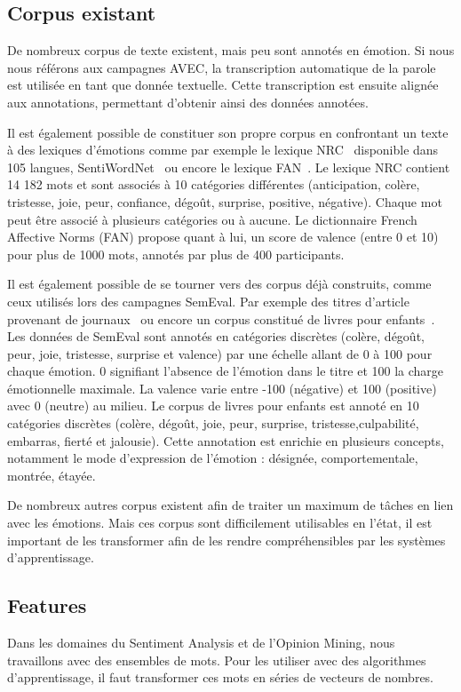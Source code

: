 \subsection{Corpus existant}
De nombreux corpus de texte existent, mais peu sont annotés en émotion. Si nous nous référons aux campagnes AVEC, la transcription automatique de la parole est utilisée en tant que donnée textuelle. Cette transcription est ensuite alignée aux annotations, permettant d'obtenir ainsi des données annotées.

Il est également possible de constituer son propre corpus en confrontant un texte à des lexiques d'émotions comme par exemple le lexique NRC~\cite{Mohammad2013} disponible dans 105 langues, SentiWordNet~\cite{Sebastiani2006} ou encore le lexique FAN~\cite{Monnier2014}.
Le lexique NRC contient 14 182 mots et sont associés à 10 catégories différentes (anticipation, colère, tristesse, joie, peur, confiance, dégoût, surprise, positive, négative). Chaque mot peut être associé à plusieurs catégories ou à aucune.
Le dictionnaire French Affective Norms (FAN) propose quant à lui, un score de valence (entre 0 et 10) pour plus de 1000 mots, annotés par plus de 400 participants.

Il est également possible de se tourner vers des corpus déjà construits, comme ceux utilisés lors des campagnes SemEval. Par exemple des titres d'article provenant de journaux~\cite{Strapparava2010} ou encore un corpus constitué de livres pour enfants~\cite{Etienne2020}. Les données de SemEval sont annotés en catégories discrètes (colère, dégoût, peur, joie, tristesse, surprise et valence) par une échelle allant de 0 à 100 pour chaque émotion. 0 signifiant l'absence de l'émotion dans le titre et 100 la charge émotionnelle maximale. La valence varie entre -100 (négative) et 100 (positive) avec 0 (neutre) au milieu. Le corpus de livres pour enfants est annoté en 10 catégories discrètes (colère, dégoût, joie, peur, surprise, tristesse,culpabilité, embarras, fierté et jalousie). Cette annotation est enrichie en plusieurs concepts, notamment le mode d'expression de l'émotion : désignée, comportementale, montrée, étayée.

De nombreux autres corpus existent afin de traiter un maximum de tâches en lien avec les émotions. Mais ces corpus sont difficilement utilisables en l'état, il est important de les transformer afin de les rendre compréhensibles par les systèmes d'apprentissage.

\subsection{Features}
Dans les domaines du Sentiment Analysis et de l'Opinion Mining, nous travaillons avec des ensembles de mots. Pour les utiliser avec des algorithmes d'apprentissage, il faut transformer ces mots en séries de vecteurs de nombres.

